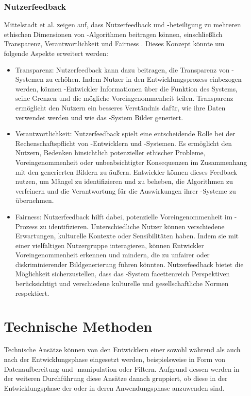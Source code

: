 \documentclass[hidelinks,12pt]{report}
\begin{document}
\subsubsection{Nutzerfeedback}
Mittelstadt et al. zeigen auf, dass Nutzerfeedback und -beteiligung zu mehreren ethischen Dimensionen von -Algorithmen beitragen können, einschließlich Transparenz, Verantwortlichkeit und Fairness \cite{Mittelstadt}. Dieses Konzept könnte um folgende Aspekte erweitert werden:
\\
\begin{itemize}
	\item Transparenz: Nutzerfeedback kann dazu beitragen, die Transparenz von -Systemen zu erhöhen. Indem Nutzer in den Entwicklungsprozess einbezogen werden, können -Entwickler Informationen über die Funktion des Systems, seine Grenzen und die mögliche Voreingenommenheit teilen. Transparenz ermöglicht den Nutzern ein besseres Verständnis dafür, wie ihre Daten verwendet werden und wie das -System Bilder generiert.
	\item Verantwortlichkeit: Nutzerfeedback spielt eine entscheidende Rolle bei der Rechenschaftspflicht von -Entwicklern und -Systemen. Es ermöglicht den Nutzern, Bedenken hinsichtlich potenzieller ethischer Probleme, Voreingenommenheit oder unbeabsichtigter Konsequenzen im Zusammenhang mit den generierten Bildern zu äußern. Entwickler können dieses Feedback nutzen, um Mängel zu identifizieren und zu beheben, die Algorithmen zu verfeinern und die Verantwortung für die Auswirkungen ihrer -Systeme zu übernehmen.
	\item Fairness: Nutzerfeedback hilft dabei, potenzielle Voreingenommenheit im -Prozess zu identifizieren. Unterschiedliche Nutzer können verschiedene Erwartungen, kulturelle Kontexte oder Sensibilitäten haben. Indem sie mit einer vielfältigen Nutzergruppe interagieren, können Entwickler Voreingenommenheit erkennen und mindern, die zu unfairer oder diskriminierender Bildgenerierung führen könnten. Nutzerfeedback bietet die Möglichkeit sicherzustellen, dass das -System facettenreich Perspektiven berücksichtigt und verschiedene kulturelle und gesellschaftliche Normen respektiert.
\end{itemize}

\section{Technische Methoden}
Technische Ansätze können von den Entwicklern einer  sowohl während als auch nach der Entwicklungsphase eingesetzt werden, beispielsweise in Form von Datenaufbereitung und -manipulation oder Filtern. Aufgrund dessen werden in der weiteren Durchführung diese Ansätze danach gruppiert, ob diese in der Entwicklungsphase der  oder in deren Anwendungsphase anzuwenden sind.
\end{document}
